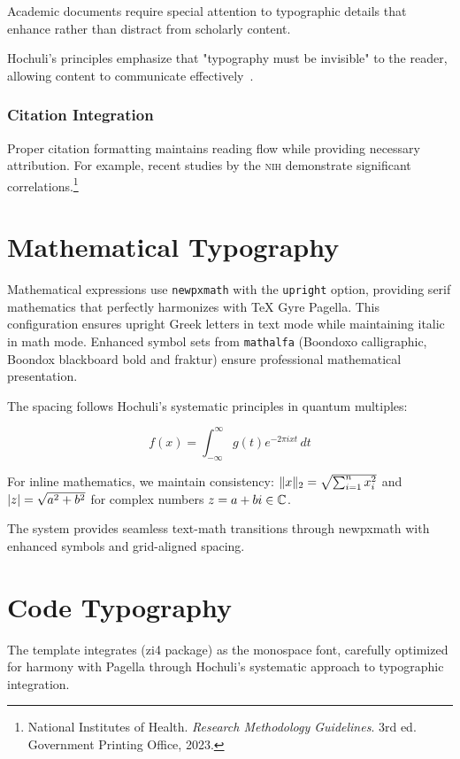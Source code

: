 \documentclass[11pt]{article}
\begin{document}
Academic documents require special attention to typographic details that enhance rather than distract from scholarly content.

Hochuli's principles emphasize that "typography must be invisible" to the reader, allowing content to communicate effectively~\parencite{hochuli1987detail}.

\subsubsection{Citation Integration}

Proper citation formatting maintains reading flow while providing necessary attribution. For example, recent studies by the \textsc{nih} demonstrate significant correlations.\footnote{National Institutes of Health. \textit{Research Methodology Guidelines}. 3rd ed. Government Printing Office, 2023.}

\section{Mathematical Typography}

Mathematical expressions use \texttt{newpxmath} with the \texttt{upright} option, providing serif mathematics that perfectly harmonizes with TeX Gyre Pagella. This configuration ensures upright Greek letters in text mode while maintaining italic in math mode. Enhanced symbol sets from \texttt{mathalfa} (Boondoxo calligraphic, Boondox blackboard bold and fraktur) ensure professional mathematical presentation.

The spacing follows Hochuli's systematic principles in quantum multiples:

\begin{equation}
f(x) = \int_{-\infty}^{\infty} g(t) e^{-2\pi i x t} \, dt
\end{equation}

For inline mathematics, we maintain consistency: $\lVert x\rVert_2 = \sqrt{\sum_{i=1}^n x_i^2}$ and $\lvert z\rvert = \sqrt{a^2 + b^2}$ for complex numbers $z = a + bi \in \mathbb{C}$.

 The system provides seamless text-math transitions through newpxmath with enhanced symbols and grid-aligned spacing.

\section{Code Typography}

The template integrates  (zi4 package) as the monospace font, carefully optimized for harmony with Pagella through Hochuli's systematic approach to typographic integration.
\end{document}
